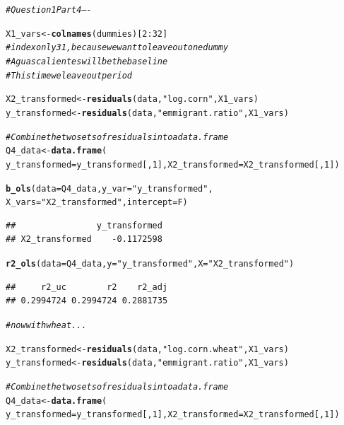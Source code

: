 \documentclass[english, 11pt]{article}\usepackage[]{graphicx}\usepackage[]{color}
\makeatletter
\newcommand{\hlnum}[1]{\textcolor[rgb]{0.686,0.059,0.569}{#1}}%
\newcommand{\hlstr}[1]{\textcolor[rgb]{0.192,0.494,0.8}{#1}}%
\newcommand{\hlcom}[1]{\textcolor[rgb]{0.678,0.584,0.686}{\textit{#1}}}%
\newcommand{\hlopt}[1]{\textcolor[rgb]{0,0,0}{#1}}%
\newcommand{\hlstd}[1]{\textcolor[rgb]{0.345,0.345,0.345}{#1}}%
\newcommand{\hlkwb}[1]{\textcolor[rgb]{0.69,0.353,0.396}{#1}}%
\newcommand{\hlkwc}[1]{\textcolor[rgb]{0.333,0.667,0.333}{#1}}%
\newcommand{\hlkwd}[1]{\textcolor[rgb]{0.737,0.353,0.396}{\textbf{#1}}}%
\newenvironment{kframe}{%
 \def\at@end@of@kframe{}%
 \ifinner\ifhmode%
  \def\at@end@of@kframe{\end{minipage}}%
  \begin{minipage}{\columnwidth}%
 \fi\fi%
 \def\FrameCommand##1{\hskip\@totalleftmargin \hskip-\fboxsep
 \colorbox{shadecolor}{##1}\hskip-\fboxsep
     \hskip-\linewidth \hskip-\@totalleftmargin \hskip\columnwidth}%
 \MakeFramed {\advance\hsize-\width
   \@totalleftmargin\z@ \linewidth\hsize
   \@setminipage}}%
 {\par\unskip\endMakeFramed%
 \at@end@of@kframe}
\newenvironment{knitrout}{}{} %
\makeatother
\begin{document}
\begin{knitrout}\footnotesize
{}\color{fgcolor}\begin{kframe}
\begin{alltt}
\hlcom{# Question 1 Part 4 ----}


\hlstd{X1_vars}\hlkwb{<-}\hlkwd{colnames}\hlstd{(dummies)[}\hlnum{2}\hlopt{:}\hlnum{32}\hlstd{]}
\hlcom{#   index only 31, because we want to leave out one dummy}
\hlcom{#   Aguascalientes will be the baseline }
\hlcom{#   This time we leave out period }

\hlstd{X2_transformed} \hlkwb{<-} \hlkwd{residuals}\hlstd{(data,} \hlstr{"log.corn"}\hlstd{, X1_vars)}
\hlstd{y_transformed} \hlkwb{<-} \hlkwd{residuals}\hlstd{(data,} \hlstr{"emmigrant.ratio"}\hlstd{, X1_vars)}

\hlcom{# Combine the two sets of residuals into a data.frame}
\hlstd{Q4_data} \hlkwb{<-} \hlkwd{data.frame}\hlstd{(}
  \hlkwc{y_transformed} \hlstd{= y_transformed[,}\hlnum{1}\hlstd{],} \hlkwc{X2_transformed} \hlstd{= X2_transformed[,}\hlnum{1}\hlstd{])}

\hlkwd{b_ols}\hlstd{(}\hlkwc{data} \hlstd{= Q4_data,} \hlkwc{y_var} \hlstd{=} \hlstr{"y_transformed"}\hlstd{,}
      \hlkwc{X_vars} \hlstd{=} \hlstr{"X2_transformed"}\hlstd{,} \hlkwc{intercept} \hlstd{= F)}
\end{alltt}
\begin{verbatim}
##                y_transformed
## X2_transformed    -0.1172598
\end{verbatim}
\begin{alltt}
\hlkwd{r2_ols}\hlstd{(}\hlkwc{data} \hlstd{= Q4_data,} \hlkwc{y} \hlstd{=} \hlstr{"y_transformed"}\hlstd{,} \hlkwc{X} \hlstd{=} \hlstr{"X2_transformed"}\hlstd{)}
\end{alltt}
\begin{verbatim}
##     r2_uc        r2    r2_adj 
## 0.2994724 0.2994724 0.2881735
\end{verbatim}
\begin{alltt}
\hlcom{#now with wheat... }

\hlstd{X2_transformed} \hlkwb{<-} \hlkwd{residuals}\hlstd{(data,} \hlstr{"log.corn.wheat"}\hlstd{, X1_vars)}
\hlstd{y_transformed} \hlkwb{<-} \hlkwd{residuals}\hlstd{(data,} \hlstr{"emmigrant.ratio"}\hlstd{, X1_vars)}

\hlcom{# Combine the two sets of residuals into a data.frame}
\hlstd{Q4_data} \hlkwb{<-} \hlkwd{data.frame}\hlstd{(}
  \hlkwc{y_transformed} \hlstd{= y_transformed[,}\hlnum{1}\hlstd{],} \hlkwc{X2_transformed} \hlstd{= X2_transformed[,}\hlnum{1}\hlstd{])}


\end{alltt}
\end{kframe}
\end{knitrout}
\end{document}
